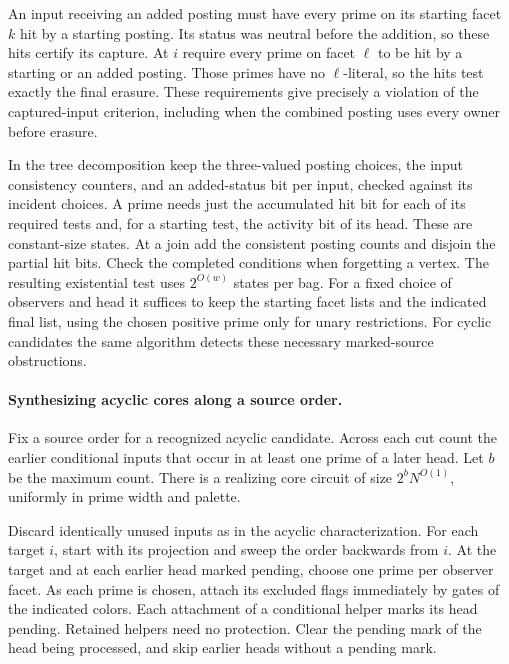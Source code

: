 An input receiving an added posting
must have every prime on its starting
facet $k$ hit by a starting posting.
Its status was neutral before the
addition, so these hits certify its
capture. At $i$ require every prime
on facet $\ell$ to be hit by a starting
or an added posting. Those primes have
no $\ell$-literal, so the hits test
exactly the final erasure. These
requirements give precisely a
violation of the captured-input
criterion, including when the
combined posting uses every owner
before erasure.

In the tree decomposition keep the
three-valued posting choices, the
input consistency counters, and an
added-status bit per input, checked
against its incident choices. A
prime needs just the accumulated
hit bit for each of its required
tests and, for a starting test,
the activity bit of its head.
These are constant-size states.
At a join add the consistent
posting counts and disjoin the
partial hit bits. Check the completed
conditions when forgetting a vertex.
The resulting existential test uses
$2^{O(w)}$ states per bag. For a
fixed choice of observers and head
it suffices to keep the starting
facet lists and the indicated final
list, using the chosen positive
prime only for unary restrictions.
For cyclic candidates the same
algorithm detects these necessary
marked-source obstructions.

\paragraph{Synthesizing acyclic cores along a source order.}
Fix a source order for a recognized acyclic candidate.
Across each cut count the earlier conditional inputs
that occur in at least one prime of a later head.
Let $b$ be the maximum count. There is a realizing
core circuit of size $2^b N^{O(1)}$, uniformly in
prime width and palette.

Discard identically unused inputs as in the acyclic
characterization. For each target $i$, start with its
projection and sweep the order backwards from $i$. At the target
and at each earlier head marked pending, choose one
prime per observer facet. As each prime is chosen,
attach its excluded flags immediately by gates of
the indicated colors. Each attachment of a
conditional helper marks its head pending. Retained
helpers need no protection. Clear the pending mark
of the head being processed, and skip earlier heads
without a pending mark.

